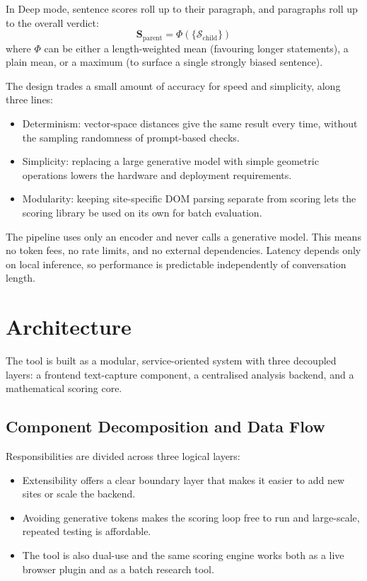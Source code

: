 \documentclass[runningheads]{llncs}
\begin{document}
In Deep mode, sentence scores roll up to their paragraph, and paragraphs roll up to the overall verdict:
\begin{equation}
  \mathbf{S}_{\mathrm{parent}} = \Phi(\{\mathcal{S}_{\mathrm{child}}\})
\end{equation}
where $\Phi$ can be either a length-weighted mean (favouring longer statements), a plain mean, or a maximum (to surface a single strongly biased sentence).

The design trades a small amount of accuracy for speed and simplicity, along three lines:
\begin{itemize}
  \item Determinism: vector-space distances give the same result every time, without the sampling randomness of prompt-based checks.
  \item Simplicity: replacing a large generative model with simple geometric operations lowers the hardware and deployment requirements.
  \item Modularity: keeping site-specific DOM parsing separate from scoring lets the scoring library be used on its own for batch evaluation.
\end{itemize}

The pipeline uses only an encoder and never calls a generative model. This means no token fees, no rate limits, and no external dependencies. Latency depends only on local inference, so performance is predictable independently of conversation length.


\section{Architecture}
\label{sec:architecture}
The tool is built as a modular, service-oriented system with three decoupled layers: a frontend text-capture component, a centralised analysis backend, and a mathematical scoring core.

\subsection{Component Decomposition and Data Flow}
\label{subsec:components}
Responsibilities are divided across three logical layers:
\begin{itemize}
  \item Extensibility offers a clear boundary layer that makes it easier to add new sites or scale the backend.
  \item Avoiding generative tokens makes the scoring loop free to run and large-scale, repeated testing is affordable.
  \item The tool is also dual-use and the same scoring engine works both as a live browser plugin and as a batch research tool.
\end{itemize}
\end{document}
